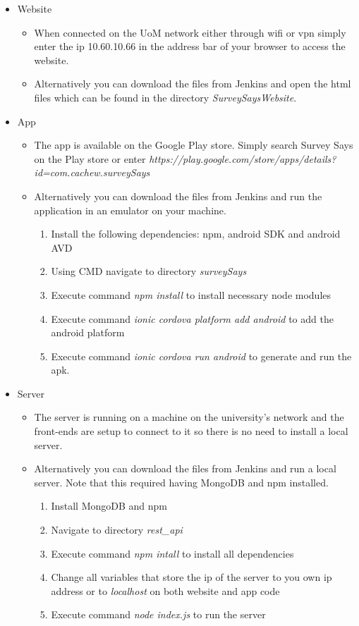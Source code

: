 \documentclass[12pt, a4paper]{report}
\begin{document}
\begin{itemize}
\item Website
	\begin{itemize}
		\item When connected on the UoM network either through wifi or vpn simply enter the ip 10.60.10.66 in the address bar of your browser to access the website.
		\item Alternatively you can download the files from Jenkins and open the html files which can be found in the directory \textit{SurveySaysWebsite}.
	\end{itemize}
\item App
	\begin{itemize}
		\item The app is available on the Google Play store. Simply search Survey Says on the Play store or enter \textit{https://play.google.com/store/apps/details?id=com.cachew.surveySays}
		\item Alternatively you can download the files from Jenkins and run the application in an emulator on your machine. 
		\begin{enumerate}
		\item Install the following dependencies: npm, android SDK and android AVD
		\item Using CMD navigate to directory \textit{surveySays}
		\item Execute command \textit{npm install} to install necessary node modules
		\item Execute command \textit{ionic cordova platform add android} to add the android platform
		\item Execute command \textit{ionic cordova run android} to generate and run the apk.
		\end{enumerate}					
	\end{itemize}
\item Server
	\begin{itemize}
		\item The server is running on a machine on the university's network and the front-ends are setup to connect to it so there is no need to install a local server.
		\item Alternatively you can download the files from Jenkins and run a local server. Note that this required having MongoDB and npm installed.
		\begin{enumerate}
			\item Install MongoDB and npm
			\item Navigate to directory \textit{rest\_api}
			\item Execute command \textit{npm intall} to install all dependencies
			\item Change all variables that store the ip of the server to you own ip address or to \textit{localhost} on both website and app code
			\item Execute command \textit{node index.js} to run the server
		\end{enumerate}
	\end{itemize}
\end{itemize}
\newpage
\end{document}
